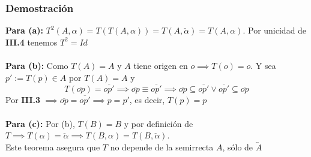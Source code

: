 \documentclass[a4paper]{article}
\begin{document}
\subsubsection{Demostración}
\textbf{Para (a):} $T^2(A,\alpha)=T(T(A,\alpha))=T(A,\check{\alpha})=T(A,\alpha)$. Por unicidad de \textbf{III.4} tenemos $T^2=Id$\\\\
\textbf{Para (b):} Como $T(A)=A$ y $A$ tiene origen en $o \implies T(o)=o$. Y sea $p':=T(p) \in A$ por $T(A)=A$ y 
\begin{equation*}
    T(\overline{op})=\overline{op'} \implies \overline{op} \equiv \overline{op'} \implies \overline{op} \subseteq \overline{op'} \lor \overline{op'} \subseteq \overline{op}
\end{equation*} 
Por \textbf{III.3} $\implies \overline{op}= \overline{op'} \implies p=p'$, es decir, $T(p)=p$\\\\
\textbf{Para (c):} Por (b), $T(B)=B$ y por definición de $T \implies T(\alpha)=\check{\alpha} \implies T(B,\alpha)=T(B, \check{\alpha})$.\\
Este teorema asegura que $T$ no depende de la semirrecta $A$, sólo de $\overleftrightarrow{A}$
\end{document}
